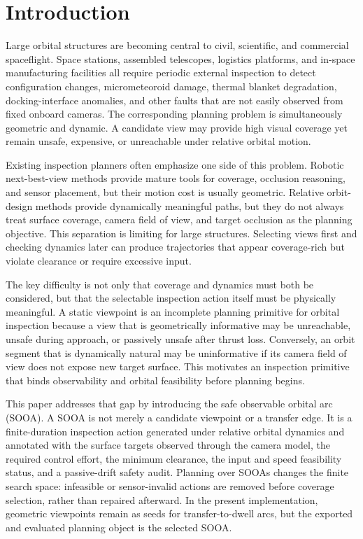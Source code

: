 \section{Introduction}
\label{sec:introduction}

Large orbital structures are becoming central to civil, scientific, and
commercial spaceflight. Space stations, assembled telescopes, logistics
platforms, and in-space manufacturing facilities all require periodic external
inspection to detect configuration changes, micrometeoroid damage, thermal
blanket degradation, docking-interface anomalies, and other faults that are
not easily observed from fixed onboard cameras. The corresponding planning
problem is simultaneously geometric and dynamic. A candidate view may provide
high visual coverage yet remain unsafe, expensive, or unreachable under
relative orbital motion.

Existing inspection planners often emphasize one side of this problem. Robotic
next-best-view methods provide mature tools for coverage, occlusion reasoning,
and sensor placement, but their motion cost is usually geometric. Relative
orbit-design methods provide dynamically meaningful paths, but they do not
always treat surface coverage, camera field of view, and target occlusion as
the planning objective. This separation is limiting for large structures.
Selecting views first and checking dynamics later can produce trajectories
that appear coverage-rich but violate clearance or require excessive input.

The key difficulty is not only that coverage and dynamics must both be
considered, but that the selectable inspection action itself must be physically
meaningful. A static viewpoint is an incomplete planning primitive for orbital
inspection because a view that is geometrically informative may be unreachable,
unsafe during approach, or passively unsafe after thrust loss. Conversely, an
orbit segment that is dynamically natural may be uninformative if its camera
field of view does not expose new target surface. This motivates an inspection
primitive that binds observability and orbital feasibility before planning
begins.

This paper addresses that gap by introducing the safe observable orbital arc
(SOOA). A SOOA is not merely a candidate viewpoint or a transfer edge. It is a
finite-duration inspection action generated under relative orbital dynamics and
annotated with the surface targets observed through the camera model, the
required control effort, the minimum clearance, the input and speed feasibility
status, and a passive-drift safety audit. Planning over SOOAs changes the
finite search space: infeasible or sensor-invalid actions are removed before
coverage selection, rather than repaired afterward. In the present
implementation, geometric viewpoints remain as seeds for transfer-to-dwell
arcs, but the exported and evaluated planning object is the selected SOOA.


